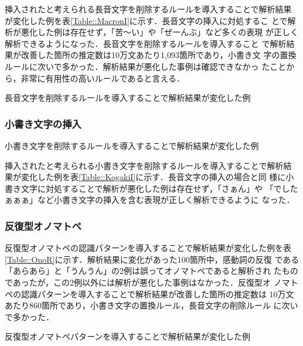\documentclass[japanese]{jnlp_1.4}
\begin{document}
  挿入されたと考えられる長音文字を削除するルールを導入することで解析結果
  が変化した例を表\ref{Table::MacronI}に示す．長音文字の挿入に対処するこ
  とで解析が悪化した例は存在せず，「苦〜い」や「ぜーんぶ」など多くの表現
  が正しく解析できるようになった．長音文字を削除するルールを導入すること
  で解析結果が改善した箇所の推定数は10万文あたり1,093箇所であり，小書き文
  字の置換ルールに次いで多かった．解析結果が悪化した事例は確認できなかっ
  たことから，非常に有用性の高いルールであると言える．

  \begin{table}[b]
   \caption{長音文字を削除するルールを導入することで解析結果が変化した例}
   \label{Table::MacronI}

  \end{table}


  \subsubsection{小書き文字の挿入}

  \begin{table}[b]
   \caption{小書き文字を削除するルールを導入することで解析結果が変化した例}
   \label{Table::KogakiI}

  \end{table}

  挿入されたと考えられる小書き文字を削除するルールを導入することで解析結
  果が変化した例を表\ref{Table::KogakiI}に示す．長音文字の挿入の場合と同
  様に小書き文字に対処することで解析が悪化した例は存在せず，「さぁん」や
  「でしたぁぁぁ」など小書き文字の挿入を含む表現が正しく解析できるように
  なった．


  \subsubsection{反復型オノマトペ}

  反復型オノマトペの認識パターンを導入することで解析結果が変化した例を表
  \ref{Table::OnoR}に示す．解析結果に変化があった100箇所中，感動詞の反復
  である「あらあら」と「うんうん」の2例は誤ってオノマトペであると解析され
  たものであったが，この2例以外には解析が悪化した事例はなかった．反復型オ
  ノマトペの認識パターンを導入することで解析結果が改善した箇所の推定数は
  10万文あたり860箇所であり，小書き文字の置換ルール，長音文字の削除ルール
  に次いで多かった．

  \begin{table}[b]
   \caption{反復型オノマトペパターンを導入することで解析結果が変化した例}
\label{Table::OnoR}

  \end{table}
\end{document}
